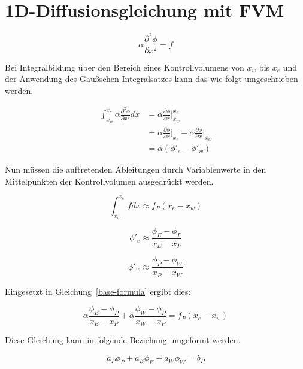 \documentclass[ngerman,colorback,accentcolor=tud2d]{tudreport}
\begin{document}
\chapter{1D-Diffusionsgleichung mit FVM}

\begin{equation} \label{base-formula}
\alpha \frac{\partial^2 \phi}{\partial x^2} = f
\end{equation}

Bei Integralbildung über den Bereich eines Kontrollvolumens von $x_w$ bis $x_e$
und der Anwendung des Gaußschen Integralsatzes kann das wie folgt umgeschrieben werden.

\begin{align*}
\int_{x_w}^{x_e}\alpha \frac{\partial^2 \phi}{\partial x^2} dx
&= \alpha \frac{\partial \phi}{\partial x}\Big|_{x_w}^{x_e}\\
&= \alpha \frac{\partial \phi}{\partial x}\Big|_{x_e}
 - \alpha \frac{\partial \phi}{\partial x}\Big|_{x_w}\\
&= \alpha (\phi'_e - \phi'_w)
\end{align*}

Nun müssen die auftretenden Ableitungen durch Variablenwerte in den Mittelpunkten
der Kontrollvolumen ausgedrückt werden.

\begin{equation*}
\int_{x_w}^{x_e}f dx \approx f_P (x_e - x_w)
\end{equation*}

\begin{equation*}
\phi'_e \approx \frac{\phi_E - \phi_P}{x_E - x_P}
\end{equation*}

\begin{equation*}
\phi'_w \approx \frac{\phi_P - \phi_W}{x_P - x_W}
\end{equation*}

Eingesetzt in Gleichung~\ref{base-formula} ergibt dies:

\begin{equation}
\alpha \frac{\phi_E - \phi_P}{x_E - x_P} + \alpha \frac{\phi_W - \phi_P}{x_W - x_P}
= f_P (x_e - x_w)
\end{equation}

Diese Gleichung kann in folgende Beziehung umgeformt werden.

\newcommand{\diffEP}{(x_E-x_P)}
\newcommand{\diffWP}{(x_W-x_P)}
\newcommand{\diffew}{(x_e-x_w)}

\begin{equation}
a_P \phi_P + a_E \phi_E + a_W \phi_W = b_P
\end{equation}
\end{document}

